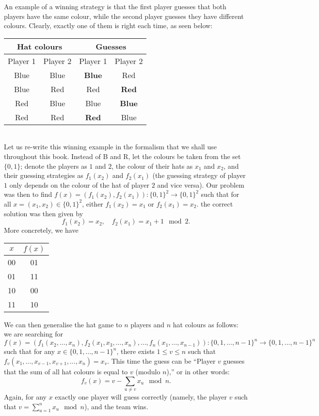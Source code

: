 \documentclass[a4paper, 11pt]{book}
\numberwithin{equation}{section}
\theoremstyle{plain}
\renewcommand{\(}{\ldbrack}
\renewcommand{\)}{\rdbrack}
\begin{document}
An example of a winning strategy is that the first player guesses that both players have the same colour, while the second player guesses they have different colours. Clearly, exactly one of them is right each time, as seen below:
~\\
\begin{center}
\begin{tabular}{|c|c||c|c|}
	\hline
	\multicolumn{2}{|c||}{Hat colours} & \multicolumn{2}{|c|}{Guesses}\\
	\hline
	Player 1 & Player 2 & Player 1 & Player 2\\
	\hline
	Blue 	& Blue & \textbf{Blue} 	& Red 	\\
	Blue 	& Red  & Red 			& \textbf{Red} 	\\
	Red 	& Blue & Blue 			& \textbf{Blue} 	\\
	Red 	& Red  & \textbf{Red} 	& Blue 	\\
	\hline
\end{tabular}
\end{center}
~\\
Let us re-write this winning example in the formalism that we shall use throughout this book. Instead of B and R, let the colours be taken from the set $\{0,1\}$; denote the players as $1$ and $2$, the colour of their hats as $x_1$ and $x_2$, and their guessing strategies as $f_1(x_2)$ and $f_2(x_1)$ (the guessing strategy of player $1$ only depends on the colour of the hat of player $2$ and vice versa). Our problem was then to find $f(x) = (f_1(x_2), f_2(x_1)) : \{0,1\}^2 \to \{0,1\}^2$ such that for all $x = (x_1, x_2) \in \{0,1\}^2$, either $f_1(x_2) = x_1$ or $f_2(x_1) = x_2$. the correct solution was then given by
\[
	f_1(x_2) = x_2, \quad f_2(x_1) = x_1 + 1 \mod 2.
\]
More concretely, we have
\begin{center}
\begin{tabular}{|c|c|}
	\hline
	$x$ & $f(x)$\\
	\hline
	00 & 01\\
	01 & 11\\
	10 & 00\\
	11 & 10\\
	\hline
\end{tabular}
\end{center}


We can then generalise the hat game to $n$ players and $n$ hat colours as follows: we are searching for
\[
	f(x) = (f_1(x_2, \dots, x_n), f_2(x_1, x_3, \dots, x_n), \dots, f_n(x_1, \dots, x_{n-1})) : \{0,1, \dots, n-1\}^n \to \{0,1,\dots,n-1\}^n
\]
such that for any $x \in \{0,1, \dots, n-1\}^n$, there exists $1 \le v \le n$ such that $f_v(x_1, \dots, x_{v-1}, x_{v+1}, \dots, x_n) = x_v$. This time the guess can be ``Player $v$ guesses that the sum of all hat colours is equal to $v$ (modulo $n$),'' or in other words:
\[
	f_v(x) = v - \sum_{u \ne v} x_u \mod n.
\]
Again, for any $x$ exactly one player will guess correctly (namely, the player $v$ such that $v = \sum_{u = 1}^n x_u \mod n$), and the team wins.
\end{document}
